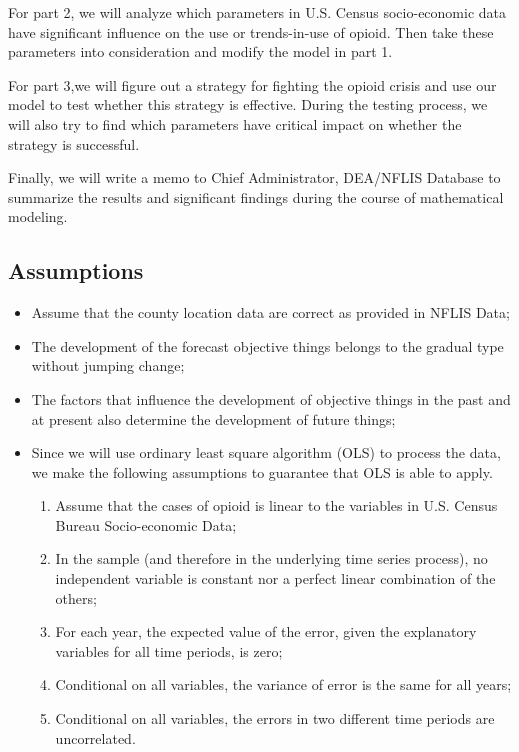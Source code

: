 \documentclass{mcmthesis}
\numberwithin{equation}{section}
\numberwithin{figure}{section}
\numberwithin{table}{section}
\theoremstyle{mydef}
\begin{document}
For part 2, we will analyze which parameters in U.S. Census socio-economic data have significant influence on the use or trends-in-use of opioid. Then take these parameters into consideration and modify the model in part 1.

For part 3,we will figure out a strategy for fighting the opioid crisis and use our model to test whether this strategy is effective. During the testing process, we will also try to find which parameters have critical impact on whether the strategy is successful.

Finally, we will write a memo to Chief Administrator, DEA/NFLIS Database to summarize the results and significant findings during the course of mathematical modeling.

\subsection{Assumptions}

\begin{itemize}
\item Assume that the county location data are correct as provided in NFLIS Data;
\item The development of the forecast objective things belongs to the gradual type without jumping change;
\item The factors that influence the development of objective things in the past and at present also determine the development of future things;
\item Since we will use ordinary least square algorithm (OLS) to process the data, we make the following assumptions to guarantee that OLS is able to apply\cite{bib:two}.
\begin{enumerate}
\item Assume that the cases of opioid is linear to the variables in U.S. Census Bureau Socio-economic Data;
\item In the sample (and therefore in the underlying time series process), no independent variable is constant nor a perfect linear combination of the others;
\item For each year, the expected value of the error, given the explanatory variables for all time periods, is zero;
\item Conditional on all variables, the variance of error is the same for all years;
\item Conditional on all variables, the errors in two different time periods are uncorrelated.
\end{enumerate}
\end{itemize}
\end{document}
